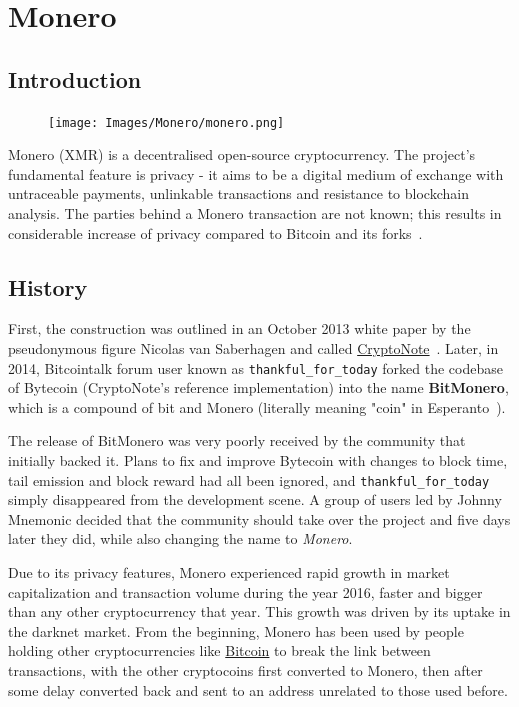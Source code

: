 \chapter{Monero} \label{sec:Monero}
%
\section{Introduction}
\begin{figure}
\centering
\texttt{[image: Images/Monero/monero.png]}
\end{figure}
Monero (XMR) is a decentralised open-source cryptocurrency. The project's fundamental feature is privacy - it aims to be a digital medium of exchange with untraceable payments, unlinkable transactions and resistance to blockchain analysis. The parties behind a Monero transaction are not known; this results in considerable increase of privacy compared to Bitcoin and its forks~\cite{monerodef}.

\section{History}
First, the construction was outlined in an October 2013 white paper by the pseudonymous figure Nicolas van Saberhagen and called \hyperref[sec:CryptoNote]{CryptoNote}~\cite{citeulike:14139412}. Later, in 2014, Bitcointalk forum user known as \verb|thankful_for_today| forked the codebase of Bytecoin (CryptoNote's reference implementation) into the name \textbf{BitMonero}, which is a compound of bit and Monero (literally meaning "coin" in Esperanto~\cite{esperanto}).

The release of BitMonero was very poorly received by the community that initially backed it. Plans to fix and improve Bytecoin with changes to block time, tail emission and block reward had all been ignored, and \verb|thankful_for_today| simply disappeared from the development scene. A group of users led by Johnny Mnemonic decided that the community should take over the project and five days later they did, while also changing the name to \emph{Monero}.

Due to its privacy features, Monero experienced rapid growth in market capitalization and transaction volume during the year 2016, faster and bigger than any other cryptocurrency that year. This growth was driven by its uptake in the darknet market. From the beginning, Monero has been used by people holding other cryptocurrencies like \hyperref[sec:Bitcoin]{Bitcoin} to break the link between transactions, with the other cryptocoins first converted to Monero, then after some delay converted back and sent to an address unrelated to those used before.

